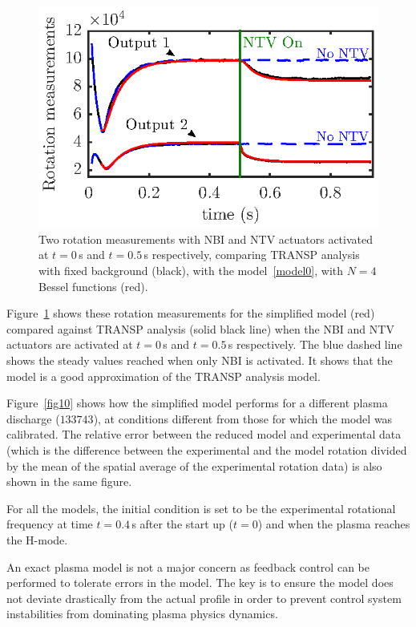 \documentclass{iopart}
\begin{document}
\begin{figure}
\centering
\includegraphics{fig8} %
\caption{Two rotation measurements with NBI and NTV actuators activated at $t=0$\,s and $t=0.5$\,s respectively, comparing TRANSP analysis with fixed background (black), with the model~\eqref{model0}, with $N=4$ Bessel functions (red).}
\label{Goum12}
\end{figure}

Figure~\ref{Goum12} shows these rotation measurements for the simplified model (red) compared against TRANSP analysis (solid black line) when the NBI and NTV actuators are activated at $t=0$\,s and $t=0.5$\,s respectively. The blue dashed line shows the steady values reached when only NBI is activated. It shows that the model is a good approximation of the TRANSP analysis model.


Figure~\ref{fig10} shows how the simplified model performs for a different plasma discharge ($133743$), at conditions different from those for which the model was calibrated.  The relative error between the reduced model and experimental data (which is the difference between the experimental and the model rotation divided by the mean of the spatial average of the experimental rotation data) is also shown in  the same figure.

For all the models, the initial condition is set to be the experimental rotational frequency at  time $t=0.4$\,s after the start up ($t=0$) and when the plasma reaches the H-mode.

An exact plasma model is not a major concern as feedback control can be performed to tolerate errors in the model. The key is to ensure the model does not deviate drastically from the actual profile in order to prevent control system instabilities from dominating plasma physics dynamics.
\end{document}
